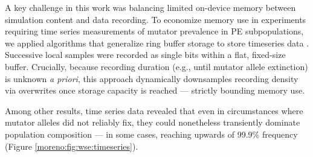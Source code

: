 A key challenge in this work was balancing limited on-device memory between simulation content and data recording.
To economize memory use in experiments requiring time series measurements of mutator prevalence in PE subpopulations, we applied algorithms that generalize ring buffer storage to store timeseries data \cite{moreno2024algorithms,gunther2014algorithm}.
Successive local samples were recorded as single bits within a flat, fixed-size buffer.
Crucially, because recording duration (e.g., until mutator allele extinction) is unknown \textit{a priori}, this approach dynamically downsamples recording density via overwrites once storage capacity is reached --- strictly bounding memory use.

Among other results, time series data revealed that even in circumstances where mutator alleles did not reliably fix, they could nonetheless transiently dominate population composition --- in some cases, reaching upwards of 99.9\% frequency (Figure \ref{moreno:fig:wse:timeseries}).



